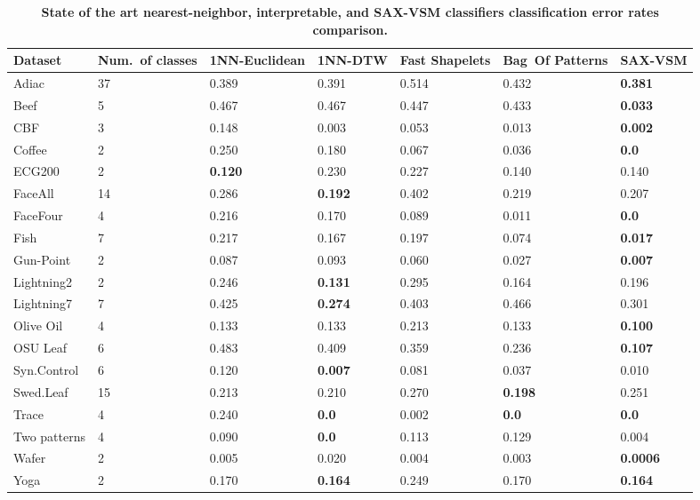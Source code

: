 \begin{table}[t!]
\captionsetup{justification=centering}
\caption{\bf State of the art nearest-neighbor, interpretable, and \mbox{SAX-VSM} classifiers classification error rates comparison.}
 \label{perf_table1}
{\setlength{\extrarowheight}{1.5pt}%
{\footnotesize
\begin{tabularx}{\linewidth}{@{} l *6X @{}}
\hline
Dataset & \mbox{Num. of} classes & 1NN-Euclidean & 1NN-DTW & Fast Shapelets &  \mbox{Bag Of} \mbox{Patterns}
& SAX-VSM\\
\hline
Adiac        &37  & 0.389   & 0.391  & 0.514  & 0.432  & \textbf{0.381}\\
Beef         &5   & 0.467   & 0.467  & 0.447  & 0.433  & \textbf{0.033}\\
CBF         & 3  & 0.148    & 0.003  & 0.053    & 0.013 & \textbf{0.002} \\
Coffee       &2    & 0.250   & 0.180  & 0.067     & 0.036     & \textbf{0.0} \\
ECG200     &2   & \textbf{0.120}  & 0.230  & 0.227     & 0.140   & 0.140 \\
FaceAll      &14  & 0.286   & \textbf{0.192}  & 0.402     & 0.219   & 0.207\\
FaceFour    &4   & 0.216   & 0.170  & 0.089     & 0.011   & \textbf{0.0} \\
Fish         &7   & 0.217   & 0.167  & 0.197    & 0.074   & \textbf{0.017} \\
Gun-Point    &2   & 0.087   & 0.093  & 0.060     & 0.027     & \textbf{0.007} \\
Lightning2    &2   & 0.246   & \textbf{0.131}  & 0.295  & 0.164  & 0.196 \\
Lightning7    &7   & 0.425   & \textbf{0.274}  & 0.403  & 0.466  & 0.301 \\
Olive Oil     &4   & 0.133   & 0.133  & 0.213     & 0.133  & \textbf{0.100}\\
OSU Leaf    &6   & 0.483   & 0.409  & 0.359     & 0.236  & \textbf{0.107} \\
Syn.Control  &6   & 0.120   & \textbf{0.007}  & 0.081     & 0.037  & 0.010 \\
Swed.Leaf   &15  & 0.213   & 0.210 & 0.270 & \textbf{0.198} & 0.251 \\
Trace       &4   & 0.240   & \textbf{0.0}    & 0.002  & \textbf{0.0} & \textbf{0.0} \\
Two patterns &4   & 0.090   & \textbf{0.0}    & 0.113   & 0.129      & 0.004 \\
Wafer        &2    & 0.005   & 0.020     & 0.004  & 0.003 & \textbf{0.0006} \\
Yoga        &2    & 0.170   & \textbf{0.164}  & 0.249 & 0.170 & \textbf{0.164} \\
\hline
\end{tabularx}
}}
\end{table}

